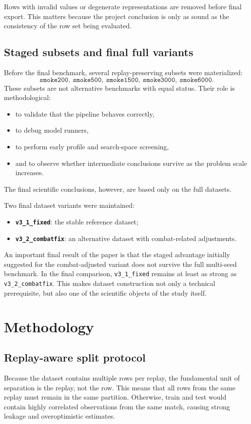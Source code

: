 \documentclass[11pt,a4paper]{article}
\begin{document}
Rows with invalid values or degenerate representations are removed before final export. This matters because the project conclusion is only as sound as the consistency of the row set being evaluated.

\subsection{Staged subsets and final full variants}
Before the final benchmark, several replay-preserving subsets were materialized:
\[
\texttt{smoke200},\ \texttt{smoke500},\ \texttt{smoke1500},\ \texttt{smoke3000},\ \texttt{smoke6000}.
\]
These subsets are not alternative benchmarks with equal status. Their role is methodological:
\begin{itemize}
    \item to validate that the pipeline behaves correctly,
    \item to debug model runners,
    \item to perform early profile and search-space screening,
    \item and to observe whether intermediate conclusions survive as the problem scale increases.
\end{itemize}

The final scientific conclusions, however, are based only on the full datasets.

Two final dataset variants were maintained:
\begin{itemize}
    \item \textbf{\texttt{v3\_1\_fixed}}: the stable reference dataset;
    \item \textbf{\texttt{v3\_2\_combatfix}}: an alternative dataset with combat-related adjustments.
\end{itemize}

An important final result of the paper is that the staged advantage initially suggested for the combat-adjusted variant does not survive the full multi-seed benchmark. In the final comparison, \texttt{v3\_1\_fixed} remains at least as strong as \texttt{v3\_2\_combatfix}. This makes dataset construction not only a technical prerequisite, but also one of the scientific objects of the study itself.

\section{Methodology}
\subsection{Replay-aware split protocol}
Because the dataset contains multiple rows per replay, the fundamental unit of separation is the replay, not the row. This means that all rows from the same replay must remain in the same partition. Otherwise, train and test would contain highly correlated observations from the same match, causing strong leakage and overoptimistic estimates.
\end{document}
